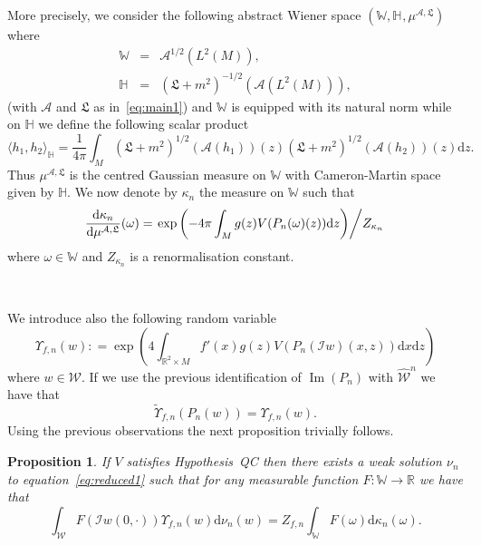 \documentclass[a4paper,10pt]{article}
\newcommand{\mathd}{\mathrm{d}}
\newcommand{\nobracket}{}
\newcommand{\tmop}[1]{\ensuremath{\operatorname{#1}}}
\newtheorem{proposition}{Proposition}
{\theorembodyfont{\rmfamily}\newtheorem{remark}{Remark}}
\begin{document}
More precisely, we consider the following abstract Wiener space $(\mathbb{W},
\mathbb{H}^{}, \mu^{\mathcal{A}, \mathfrak{L}})$ where
\begin{eqnarray}
  \mathbb{W} & = & \mathcal{A}^{1 / 2} (L^2 (M)), \nonumber\\
  \mathbb{H} & = & (\mathcal{\mathfrak{L}} + m^2)^{- 1 / 2} (\mathcal{A} (L^2
  (M))), \nonumber
\end{eqnarray}
(with $\mathcal{A}$ and $\mathfrak{L}$ as in~{\eqref{eq:main1}}) and
$\mathbb{W}$ is equipped with its natural norm while on $\mathbb{H}$ we define
the following scalar product
\begin{equation}
  \langle h_1, h_2 \rangle_{\mathbb{H}} = \frac{1}{4 \pi} \int_M (\mathfrak{L}
  + m^2)^{1 / 2} (\mathcal{A} (h_1)) (z) (\mathfrak{L} + m^2)^{1 / 2}
  (\mathcal{A} (h_2)) (z) \mathd z. \label{eq:covariance1}
\end{equation}
Thus $\mu^{\mathcal{A}, \mathfrak{L}}$ is the centred Gaussian measure on
$\mathbb{W}$ with Cameron-Martin space given by $\mathbb{H}$. We now denote by
$\kappa_n$ the measure on $\mathbb{W}$ such that
\begin{equation}
  \frac{\mathd \kappa_n}{\mathd \mu^{\mathcal{A} \mathfrak{, L}}} (\omega) =
  \left. \exp \left( - 4 \pi \int_M g (z) V (P_n (\mathcal{} \nobracket
  \omega) \nobracket (z)) \mathd z \right) \middle/ Z_{\kappa_n} \right.
  \label{eq:kappa1}
\end{equation}
where $\omega \in \mathbb{W}$ and $Z_{\kappa_n}$ is a renormalisation
constant.

\

We introduce also the following random variable
\[ \Upsilon_{f, n} (w) : = \exp \left( 4 \int_{\mathbb{R}^2 \times M} f' (x) g
   (z) V (\mathcal{} P_n (\mathcal{I} w) (x, z)) \mathd x \mathd z \right) \]
where $w \in \mathcal{W}$. If we use the previous identification of $\tmop{Im}
(P_n)$ with $\widehat{\mathcal{W}}^n$ we have that
\[ \tilde{\Upsilon}_{f, n} (P_n (w)) = \Upsilon_{f, n} (w) . \]
Using the previous observations the next proposition trivially follows.

\begin{proposition}
  \label{proposition_reduced1}If $V$ satisfies Hypothesis~QC then there exists
  a weak solution $\nu_n$ to equation~{\eqref{eq:reduced1}} such that for any
  measurable function $F : \mathbb{W} \rightarrow \mathbb{R}$ we have that
  \begin{equation}
    \int_{\mathcal{W}} F (\mathcal{I} w (0, \cdot)) \Upsilon_{f, n} (w) \mathd
    \nu_n (w) = Z_{f, n} \int_{\mathbb{W}} F (\omega) \mathd \kappa_n (\omega)
    . \label{eq:reduced8}
  \end{equation}
\end{proposition}
\end{document}
